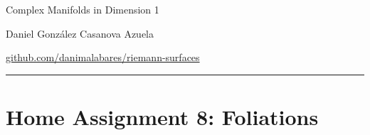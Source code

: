 \documentclass{article}
\begin{document}
\begin{minipage}{\textwidth}
	\begin{minipage}{.5\textwidth}
		Complex Manifolds in Dimension 1
	\end{minipage}%
	\begin{minipage}{.5\textwidth}
		\raggedleft
		Daniel González Casanova Azuela\par
		{\small\href{https://github.com/danimalabares/riemann-surfaces}{github.com/danimalabares/riemann-surfaces}}
	\end{minipage}%
\end{minipage}\vspace{.2cm}\hrule
\section{Home Assignment 8: Foliations}
\setcounter{section}{8}

\end{document}
